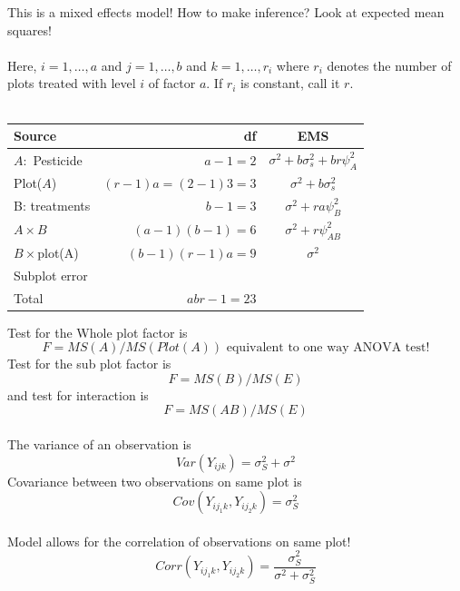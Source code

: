 This is a mixed effects model!  How to make inference?  Look at expected mean squares!\\~\\
Here, $i=1,\ldots,a$ and $j=1,\ldots,b$ and $k=1,\ldots,r_i$ where $r_i$ denotes the number of plots treated with level $i$ of factor $a$.  If $r_i$ is constant, call it $r$.\\~\\

\begin{center}
\begin{tabular}{lrc}  \hline
Source & df & EMS \\ \hline
$A:$ Pesticide & $a-1=2$ & $\sigma^2 + b \sigma_s^2 + br \psi_A^2$ \\
Plot($A$) & $(r-1)a=(2-1)3=3$ & $\sigma^2 + b \sigma_s^2$ \\
B: treatments & $b-1=3$ & $\sigma^2 + ra \psi_B^2$\\ 
$A\times B$ & $(a-1)(b-1)=6$ & $\sigma^2 + r \psi_{AB}^2$\\ 
$B\times $plot(A) & $(b-1)(r-1)a=9$ & $\sigma^2$\\ 
Subplot error & \\ \hline
Total & $abr-1=23$\\ \hline
\end{tabular}
\end{center}

\newpage

Test for the Whole plot factor is 
$$F=MS(A)/MS(Plot(A))\mbox{    equivalent to one way ANOVA test!}$$
Test for the sub plot factor is 
$$F=MS(B)/MS(E)$$
and test for interaction is
$$F=MS(AB)/MS(E)$$~\\

The variance of an observation is 
$$Var(Y_{ijk})=\sigma^2_S+\sigma^2$$
Covariance between two observations on same plot is
$$Cov(Y_{ij_1k},Y_{ij_2k})=\sigma^2_S$$~\\

Model allows for the correlation of observations on same plot!
$$Corr(Y_{ij_1k},Y_{ij_2k})=\frac{\sigma^2_S}{\sigma^2+\sigma^2_S}$$





